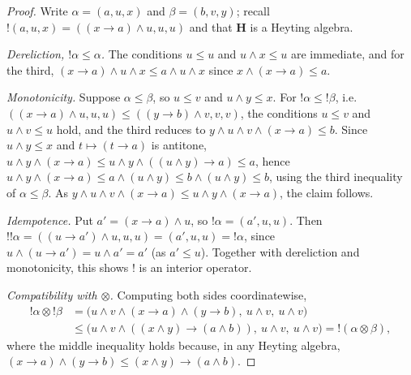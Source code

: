 \documentclass[reqno]{amsart}
\theoremstyle{plain}
\theoremstyle{definition}
\newcommand{\cf}[1]{\mathbf{#1}}
\begin{document}
\begin{proof}
    Write $ \alpha = (a,u,x) $ and $ \beta = (b,v,y) $; recall $ !(a,u,x) = ((x \rightarrow a) \wedge u, u, u) $ and that $ \cf{H} $ is a Heyting algebra.

    \emph{Dereliction, $ {!\alpha} \leq \alpha $.} The conditions $ u \leq u $ and $ u \wedge x \leq u $ are immediate, and for the third, $ (x \rightarrow a) \wedge u \wedge x \leq a \wedge u \wedge x $ since $ x \wedge (x \rightarrow a) \leq a $.

    \emph{Monotonicity.} Suppose $ \alpha \leq \beta $, so $ u \leq v $ and $ u \wedge y \leq x $. For $ {!\alpha} \leq {!\beta} $, i.e.\ $ ((x \rightarrow a) \wedge u, u, u) \leq ((y \rightarrow b) \wedge v, v, v) $, the conditions $ u \leq v $ and $ u \wedge v \leq u $ hold, and the third reduces to $ y \wedge u \wedge v \wedge (x \rightarrow a) \leq b $. Since $ u \wedge y \leq x $ and $ t \mapsto (t \rightarrow a) $ is antitone, $ u \wedge y \wedge (x \rightarrow a) \leq u \wedge y \wedge ((u \wedge y) \rightarrow a) \leq a $, hence $ u \wedge y \wedge (x \rightarrow a) \leq a \wedge (u \wedge y) \leq b \wedge (u \wedge y) \leq b $, using the third inequality of $ \alpha \leq \beta $. As $ y \wedge u \wedge v \wedge (x \rightarrow a) \leq u \wedge y \wedge (x \rightarrow a) $, the claim follows.

    \emph{Idempotence.} Put $ a' = (x \rightarrow a) \wedge u $, so $ {!\alpha} = (a', u, u) $. Then $ {!!\alpha} = ((u \rightarrow a') \wedge u, u, u) = (a', u, u) = {!\alpha} $, since $ u \wedge (u \rightarrow a') = u \wedge a' = a' $ (as $ a' \leq u $). Together with dereliction and monotonicity, this shows $ ! $ is an interior operator.

    \emph{Compatibility with $ \otimes $.} Computing both sides coordinatewise,
    \begin{align*}
        {!\alpha} \otimes {!\beta}
          &= \bigl( u \wedge v \wedge (x \rightarrow a) \wedge (y \rightarrow b),\ u \wedge v,\ u \wedge v \bigr) \\
          &\leq \bigl( u \wedge v \wedge ((x \wedge y) \rightarrow (a \wedge b)),\ u \wedge v,\ u \wedge v \bigr)
           = {!(\alpha \otimes \beta)},
    \end{align*}
    where the middle inequality holds because, in any Heyting algebra, $ (x \rightarrow a) \wedge (y \rightarrow b) \leq (x \wedge y) \rightarrow (a \wedge b) $.
\end{proof}
\end{document}
